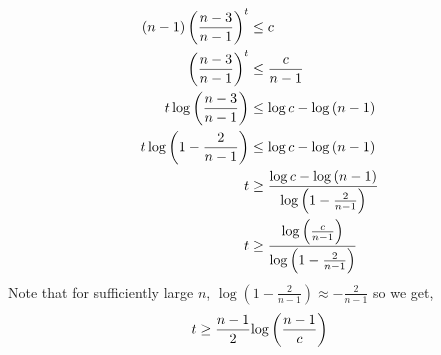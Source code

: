 \documentclass[12pt]{article}
\begin{document}
\begin{solution}
\begin{enumerate}
        \begin{align*}
            (n-1)\left(\frac{n-3}{n-1}\right)^t &\leq c \\
            \left(\frac{n-3}{n-1}\right)^t &\leq \frac{c}{n-1} \\
            t \log{\left(\frac{n-3}{n-1}\right)} &\leq \log c - \log {(n-1)}  \\ 
            t \log\left({1 - \frac{2}{n-1}}\right) &\leq \log c - \log {(n-1)}  \\ 
            t &\geq \frac{\log c - \log {(n-1)}}{ \log\left({1 - \frac{2}{n-1}}\right)}  \\ 
            t &\geq \frac{\log \left(\frac{c}{n-1}\right)}{ \log\left({1 - \frac{2}{n-1}}\right)}  
        \end{align*}
        Note that for sufficiently large $n$, $\log (1 - \frac{2}{n-1}) \approx - \frac{2}{n-1}$ so we get, 
        \[ t \geq \frac{n-1}{2}{\log \left(\frac{n-1}{c}\right)} \]
    \end{enumerate}
\end{solution}
\end{document}
